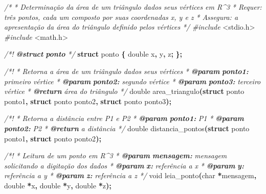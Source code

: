 \documentclass[
  11pt,
  a4paper,
]{scrbook}
\newenvironment{Shaded}{\begin{snugshade}}{\end{snugshade}}
\newcommand{\AnnotationTok}[1]{\textcolor[rgb]{0.56,0.35,0.01}{\textbf{\textit{#1}}}}
\newcommand{\CommentTok}[1]{\textcolor[rgb]{0.56,0.35,0.01}{\textit{#1}}}
\newcommand{\CommentVarTok}[1]{\textcolor[rgb]{0.56,0.35,0.01}{\textbf{\textit{#1}}}}
\newcommand{\DataTypeTok}[1]{\textcolor[rgb]{0.13,0.29,0.53}{#1}}
\newcommand{\ImportTok}[1]{#1}
\newcommand{\KeywordTok}[1]{\textcolor[rgb]{0.13,0.29,0.53}{\textbf{#1}}}
\newcommand{\NormalTok}[1]{#1}
\newcommand{\OperatorTok}[1]{\textcolor[rgb]{0.81,0.36,0.00}{\textbf{#1}}}
\newcommand{\PreprocessorTok}[1]{\textcolor[rgb]{0.56,0.35,0.01}{\textit{#1}}}
\begin{document}
\begin{Shaded}
\begin{Highlighting}[]
\CommentTok{/*}
\CommentTok{ * Determinação da área de um triângulo dados seus vértices em R\^{}3}
\CommentTok{ * Requer: três pontos, cada um composto por suas coordenadas x, y e z}
\CommentTok{ * Assegura: a apresentação da área do triângulo definido pelos vértices}
\CommentTok{ */}
\PreprocessorTok{\#include }\ImportTok{\textless{}stdio.h\textgreater{}}
\PreprocessorTok{\#include }\ImportTok{\textless{}math.h\textgreater{}}

\CommentTok{/*! }\AnnotationTok{@struct}\CommentTok{ }\CommentVarTok{ponto}\CommentTok{ */}
\KeywordTok{struct}\NormalTok{ ponto }\OperatorTok{\{}
    \DataTypeTok{double}\NormalTok{ x}\OperatorTok{,}\NormalTok{ y}\OperatorTok{,}\NormalTok{ z}\OperatorTok{;}
\OperatorTok{\};}

\CommentTok{/*!}
\CommentTok{ * Retorna a área de um triângulo dados seus vértices}
\CommentTok{ * }\AnnotationTok{@param}\CommentTok{ }\CommentVarTok{ponto1:}\CommentTok{ primeiro vértice}
\CommentTok{ * }\AnnotationTok{@param}\CommentTok{ }\CommentVarTok{ponto2:}\CommentTok{ segundo vértice}
\CommentTok{ * }\AnnotationTok{@param}\CommentTok{ }\CommentVarTok{ponto3:}\CommentTok{ terceiro vértice}
\CommentTok{ * }\AnnotationTok{@return}\CommentTok{ área do triângulo}
\CommentTok{ */}
\DataTypeTok{double}\NormalTok{ area\_triangulo}\OperatorTok{(}\KeywordTok{struct}\NormalTok{ ponto ponto1}\OperatorTok{,}
                      \KeywordTok{struct}\NormalTok{ ponto ponto2}\OperatorTok{,}
                      \KeywordTok{struct}\NormalTok{ ponto ponto3}\OperatorTok{);}

\CommentTok{/*!}
\CommentTok{ * Retorna a distância entre P1 e P2}
\CommentTok{ * }\AnnotationTok{@param}\CommentTok{ }\CommentVarTok{ponto1:}\CommentTok{ P1}
\CommentTok{ * }\AnnotationTok{@param}\CommentTok{ }\CommentVarTok{ponto2:}\CommentTok{ P2}
\CommentTok{ * }\AnnotationTok{@return}\CommentTok{ a distância}
\CommentTok{ */}
\DataTypeTok{double}\NormalTok{ distancia\_pontos}\OperatorTok{(}\KeywordTok{struct}\NormalTok{ ponto ponto1}\OperatorTok{,} \KeywordTok{struct}\NormalTok{ ponto ponto2}\OperatorTok{);}

\CommentTok{/*!}
\CommentTok{ * Leitura de um ponto em R\^{}3}
\CommentTok{ * }\AnnotationTok{@param}\CommentTok{ }\CommentVarTok{mensagem:}\CommentTok{ mensagem solicitando a digitação dos dados}
\CommentTok{ * }\AnnotationTok{@param}\CommentTok{ }\CommentVarTok{x:}\CommentTok{ referência a x}
\CommentTok{ * }\AnnotationTok{@param}\CommentTok{ }\CommentVarTok{y:}\CommentTok{ referência a y}
\CommentTok{ * }\AnnotationTok{@param}\CommentTok{ }\CommentVarTok{z:}\CommentTok{ referência a z}
\CommentTok{ */}
\DataTypeTok{void}\NormalTok{ leia\_ponto}\OperatorTok{(}\DataTypeTok{char} \OperatorTok{*}\NormalTok{mensagem}\OperatorTok{,} \DataTypeTok{double} \OperatorTok{*}\NormalTok{x}\OperatorTok{,} \DataTypeTok{double} \OperatorTok{*}\NormalTok{y}\OperatorTok{,} \DataTypeTok{double} \OperatorTok{*}\NormalTok{z}\OperatorTok{);}


\end{Highlighting}
\end{Shaded}
\end{document}
